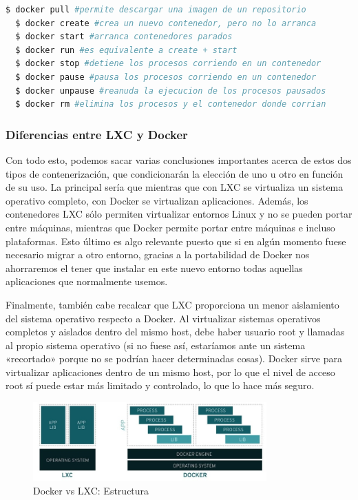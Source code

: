 \begin{lstlisting}[language=bash]
  $ docker pull #permite descargar una imagen de un repositorio
  $ docker create #crea un nuevo contenedor, pero no lo arranca 
  $ docker start #arranca contenedores parados
  $ docker run #es equivalente a create + start
  $ docker stop #detiene los procesos corriendo en un contenedor  
  $ docker pause #pausa los procesos corriendo en un contenedor
  $ docker unpause #reanuda la ejecucion de los procesos pausados
  $ docker rm #elimina los procesos y el contenedor donde corrian
\end{lstlisting}

\subsubsection{Diferencias entre LXC y Docker}
	Con todo esto, podemos sacar varias conclusiones importantes acerca de estos dos tipos de contenerización, que condicionarán la elección de uno u otro en función de su uso. La principal sería que mientras que con LXC se virtualiza un sistema operativo completo, con Docker se virtualizan aplicaciones. Además, los contenedores LXC sólo permiten virtualizar entornos Linux y no se pueden portar entre máquinas, mientras que Docker permite portar entre máquinas e incluso plataformas. Esto último es algo relevante puesto que si en algún momento fuese necesario migrar a otro entorno, gracias a la portabilidad de Docker nos ahorraremos el tener que instalar en este nuevo entorno todas aquellas aplicaciones que normalmente usemos. 

	Finalmente, también cabe recalcar que LXC proporciona un menor aislamiento del sistema operativo respecto a Docker. Al virtualizar sistemas operativos completos y aislados dentro del mismo host, debe haber usuario root y llamadas al propio sistema operativo (si no fuese así, estaríamos ante un sistema «recortado» porque no se podrían hacer determinadas cosas). Docker sirve para virtualizar aplicaciones dentro de un mismo host, por lo que el nivel de acceso root sí puede estar más limitado y controlado, lo que lo hace más seguro.

	\vspace{0.2cm}
	\begin{figure}[h]
	\centering
	\includegraphics[width=0.8\textwidth]{../imgs/EdA/LXCvsDocker.jpg}
	\caption{Docker vs LXC: Estructura}
	\label{fig:docker-life}
	\end{figure}
	\clearpage

